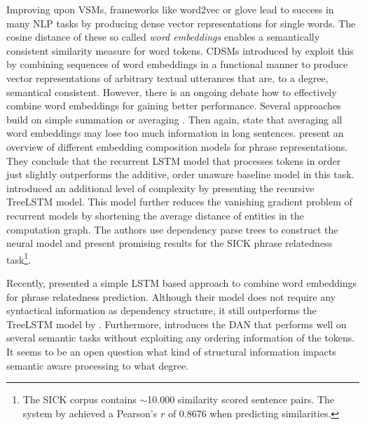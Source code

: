 Improving upon \acp{VSM}, frameworks like word2vec \autocite{mikolov_distributed_2013} or glove \autocite{pennington_glove_2014} lead to success in many \ac{NLP} tasks by producing dense vector representations for single words. The cosine distance of these so called \textit{word embeddings} enables a semantically consistent similarity measure for word tokens. \acp{CDSM} introduced by \textcite{clark_compositional_2008} exploit this by combining sequences of word embeddings in a functional manner to produce vector representations of arbitrary textual utterances that are, to a degree, semantical consistent. However, there is an ongoing debate how to effectively combine word embeddings for gaining better performance. Several approaches build on simple summation or averaging \autocite{habernal_exploiting_2015,boltuzic_identifying_2015,misra_measuring_2016}. Then again, \Textcite{misra_measuring_2016} state that averaging all word embeddings may lose too much information in long sentences. \Textcite{wang_comparison_2017} present an overview of different embedding composition models for phrase representations. They conclude that the recurrent \ac{LSTM} model \autocite{hochreiter_long_1997} that processes tokens in order just slightly outperforms the additive, order unaware baseline model in this task. \Textcite{tai_improved_2015} introduced an additional level of complexity by presenting the recursive TreeLSTM model. This model further reduces the vanishing gradient problem of recurrent models by shortening the average distance of entities in the computation graph. The authors use dependency parse trees to construct the neural model and present promising results for the SICK phrase relatedness task\footnote{The SICK corpus \autocite{marelli_sick_2014} contains $\sim$10.000 similarity scored sentence pairs. The system by \Textcite{tai_improved_2015} achieved a Pearson's $r$ of 0.8676 when predicting similarities.}. 

Recently, \Textcite{mueller_siamese_2016} presented a simple \ac{LSTM} based approach to combine word embeddings for phrase relatedness prediction. Although their model does not require any syntactical information as dependency structure, it still outperforms the TreeLSTM model by \textcite{tai_improved_2015}. Furthermore, \Textcite{iyyer_deep_2015} introduces the \ac{DAN} that performs well on several semantic tasks without exploiting any ordering information of the tokens. It seems to be an open question what kind of structural information impacts semantic aware processing to what degree.



